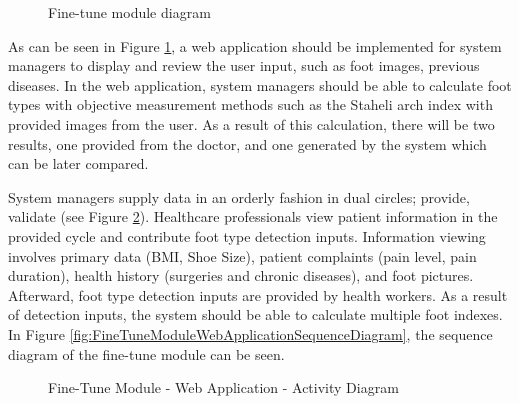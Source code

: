 \begin{figure}[htbp]
\centering
{}
\caption{Fine-tune module diagram}
\label{fig:FineTuneModuleDiagram}
\end{figure}

As can be seen in Figure \ref{fig:FineTuneModuleDiagram}, a web application should be implemented for system managers to display and review the user input, such as foot images, previous diseases. In the web application, system managers should be able to calculate foot types with objective measurement methods such as the Staheli arch index with provided images from the user. As a result of this calculation, there will be two results, one provided from the doctor, and one generated by the system which can be later compared.


System managers supply data in an orderly fashion in dual circles; provide, validate (see Figure \ref{fig:FineTuneModuleWebApplicationActivityDiagram}). Healthcare professionals view patient information in the provided cycle and contribute foot type detection inputs. Information viewing involves primary data (BMI, Shoe Size), patient complaints (pain level, pain duration), health history (surgeries and chronic diseases), and foot pictures. Afterward, foot type detection inputs are provided by health workers. As a result of detection inputs, the system should be able to calculate multiple foot indexes. In Figure \ref{fig:FineTuneModuleWebApplicationSequenceDiagram}, the sequence diagram of the fine-tune module can be seen.

\begin{figure}[htbp]
\centering
{}
\caption{Fine-Tune Module - Web Application - Activity Diagram}
\label{fig:FineTuneModuleWebApplicationActivityDiagram}
\end{figure}


